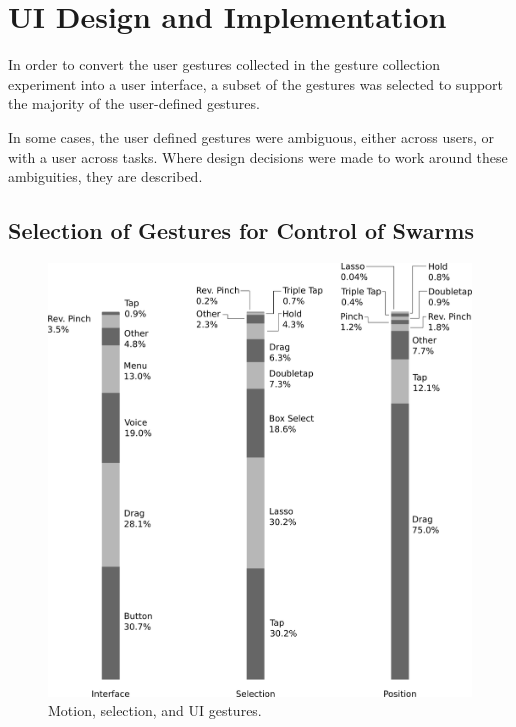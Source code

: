 \chapter{UI Design and Implementation}

In order to convert the user gestures collected in the gesture collection experiment into a user interface, a subset of the gestures was selected to support the majority of the user-defined gestures. 

In some cases, the user defined gestures were ambiguous, either across users, or with a user across tasks. 
Where design decisions were made to work around these ambiguities, they are described. 

\section{Selection of Gestures for Control of Swarms}

\begin{figure}
	\centering
	\includegraphics[width=\linewidth]{../thin_grey_text.png}
	\caption{Motion, selection, and UI gestures.}
	\label{fig:select_ui_move_breakdown}
\end{figure}

